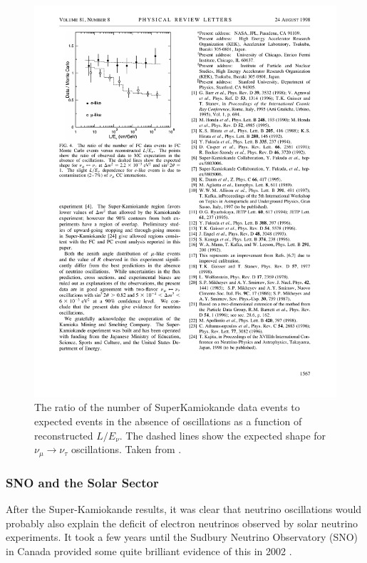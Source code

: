 \begin{figure}
  \centering
  \includegraphics{SuperKamiokandeLE.pdf}
  \caption[The ratio of the number of SuperKamiokande data events to expected events in the absence of oscillations as a function of reconstructed $L/E_{\nu}$.]{The ratio of the number of SuperKamiokande data events to expected events in the absence of oscillations as a function of reconstructed $L/E_{\nu}$.  The dashed lines show the expected shape for $\nu_{\mu}\rightarrow\nu_{\tau}$ oscillations.  Taken from \cite{SuperKamiokande1998}.}
  \label{fig:SuperKamiokandeLE}
\end{figure}

\subsubsection{SNO and the Solar Sector}\label{sec:SNO}

After the Super-Kamiokande results, it was clear that neutrino oscillations would probably also explain the deficit of electron neutrinos observed by solar neutrino experiments.  It took a few years until the Sudbury Neutrino Observatory (SNO) in Canada provided some quite brilliant evidence of this in 2002 \cite{SNO2002}.

